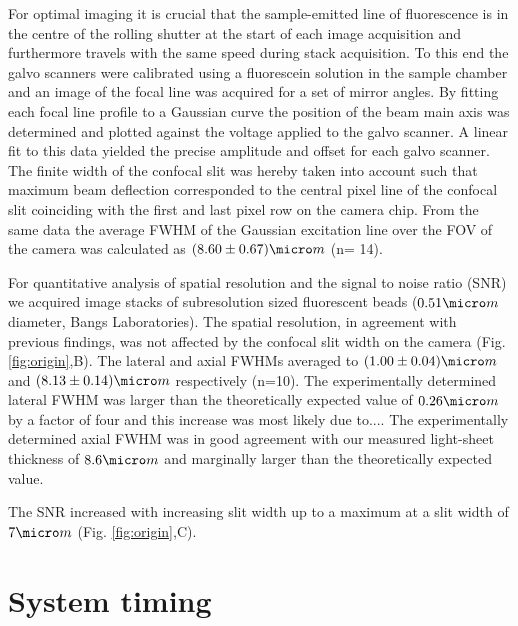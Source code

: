 \documentclass[12pt]{spieman}  %
\begin{document}
For optimal imaging it is crucial that the sample-emitted line of fluorescence is in the centre of the rolling shutter at the start of each image acquisition and furthermore travels with the same speed during stack acquisition. To this end the galvo scanners were calibrated using a fluorescein solution in the sample chamber and an image of the focal line was acquired for a set of mirror angles. By fitting each focal line profile to a Gaussian curve the position of the beam main axis was determined and plotted against the voltage applied to the galvo scanner. A linear fit to this data yielded the precise amplitude and offset for each galvo scanner. The finite width of the confocal slit was hereby taken into account such that maximum beam deflection corresponded to the central pixel line of the confocal slit coinciding with the first and last pixel row on the camera chip. From the same data the average FWHM of the Gaussian excitation line over the FOV of the camera was calculated as $(8.60\pm0.67)\micro m$ (n= 14).

For quantitative analysis of spatial resolution and the signal to noise ratio (SNR) we acquired image stacks of subresolution sized fluorescent beads ($0.51 \micro m$ diameter, Bangs Laboratories). The spatial resolution, in agreement with previous findings\cite{Wilson1987,Cox2004}, was not affected by the confocal slit width on the camera (Fig. \ref{fig:origin},B). The lateral and axial FWHMs averaged to $(1.00\pm0.04) \micro m$ and $(8.13\pm0.14) \micro m$ respectively (n=10). The experimentally determined lateral FWHM was larger than the theoretically expected value of $0.26 \micro m$ by a factor of four and this increase was most likely due to.... The experimentally determined axial FWHM was in good agreement with our measured light-sheet thickness of $8.6\micro m$ and marginally larger than the theoretically expected value.

The SNR increased with increasing slit width up to a maximum at a slit width of $7 \micro m$ (Fig. \ref{fig:origin},C).   

\section{System timing}
\label{sec:timing}
\end{document}
